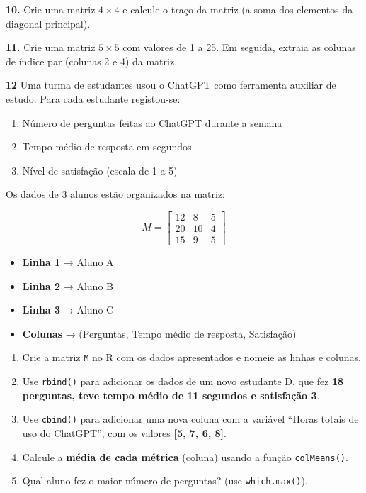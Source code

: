 \documentclass[
]{book}
\providecommand{\tightlist}{%
  \setlength{\itemsep}{0pt}\setlength{\parskip}{0pt}}
\begin{document}
\textbf{10.} Crie uma matriz \(4\times 4\) e calcule o traço da matriz (a soma
dos elementos da diagonal principal).

\textbf{11.} Crie uma matriz \(5\times 5\) com valores de 1 a 25. Em seguida,
extraia as colunas de índice par (colunas 2 e 4) da matriz.

\textbf{12} Uma turma de estudantes usou o ChatGPT como ferramenta auxiliar de estudo. Para cada estudante registou-se:

\begin{enumerate}
\def\labelenumi{\arabic{enumi}.}
\tightlist
\item
  Número de perguntas feitas ao ChatGPT durante a semana\\
\item
  Tempo médio de resposta em segundos\\
\item
  Nível de satisfação (escala de 1 a 5)
\end{enumerate}

Os dados de 3 alunos estão organizados na matriz:

\[
M = \begin{bmatrix}
12 & 8 & 5 \\
20 & 10 & 4 \\
15 & 9 & 5
\end{bmatrix}
\]

\begin{itemize}
\tightlist
\item
  \textbf{Linha 1} → Aluno A\\
\item
  \textbf{Linha 2} → Aluno B\\
\item
  \textbf{Linha 3} → Aluno C\\
\item
  \textbf{Colunas} → (Perguntas, Tempo médio de resposta, Satisfação)
\end{itemize}

\begin{enumerate}
\def\labelenumi{(\alph{enumi})}
\item
  Crie a matriz \texttt{M} no R com os dados apresentados e nomeie as linhas e colunas.
\item
  Use \texttt{rbind()} para adicionar os dados de um novo estudante D, que fez \textbf{18 perguntas, teve tempo médio de 11 segundos e satisfação 3}.
\item
  Use \texttt{cbind()} para adicionar uma nova coluna com a variável ``Horas totais de uso do ChatGPT'', com os valores \textbf{{[}5, 7, 6, 8{]}}.
\item
  Calcule a \textbf{média de cada métrica} (coluna) usando a função \texttt{colMeans()}.
\item
  Qual aluno fez o maior número de perguntas? (use \texttt{which.max()}).
\end{enumerate}
\end{document}
